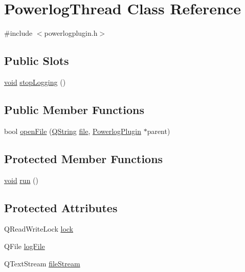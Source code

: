 \hypertarget{class_powerlog_thread}{\section{\-Powerlog\-Thread \-Class \-Reference}
\label{class_powerlog_thread}
}


{\ttfamily \#include $<$powerlogplugin.\-h$>$}

\subsection*{\-Public \-Slots}
\begin{DoxyCompactItemize}
\item 
\hyperlink{group___u_a_v_objects_plugin_ga444cf2ff3f0ecbe028adce838d373f5c}{void} \hyperlink{group___power_log_ga9a391d6c905ecddc9bbc2dd34f055d7c}{stop\-Logging} ()
\end{DoxyCompactItemize}
\subsection*{\-Public \-Member \-Functions}
\begin{DoxyCompactItemize}
\item 
bool \hyperlink{group___power_log_gac2181c168547833f7826354c333cd431}{open\-File} (\hyperlink{group___u_a_v_objects_plugin_gab9d252f49c333c94a72f97ce3105a32d}{\-Q\-String} \hyperlink{uavobjecttemplate_8m_a97c04efa65bcf0928abf9260bc5cbf46}{file}, \hyperlink{class_powerlog_plugin}{\-Powerlog\-Plugin} $\ast$parent)
\end{DoxyCompactItemize}
\subsection*{\-Protected \-Member \-Functions}
\begin{DoxyCompactItemize}
\item 
\hyperlink{group___u_a_v_objects_plugin_ga444cf2ff3f0ecbe028adce838d373f5c}{void} \hyperlink{group___power_log_ga8a04077cf7c30019689b894c73cb0020}{run} ()
\end{DoxyCompactItemize}
\subsection*{\-Protected \-Attributes}
\begin{DoxyCompactItemize}
\item 
\-Q\-Read\-Write\-Lock \hyperlink{class_powerlog_thread_a365d62f374a4aa61f14a3a505fd76414}{lock}
\item 
\-Q\-File \hyperlink{class_powerlog_thread_a62efcac44703411ff9cf47f57a7f1b86}{log\-File}
\item 
\-Q\-Text\-Stream \hyperlink{class_powerlog_thread_a3c63539ac0a8a7b720cfb346591a1a7a}{file\-Stream}
\end{DoxyCompactItemize}


